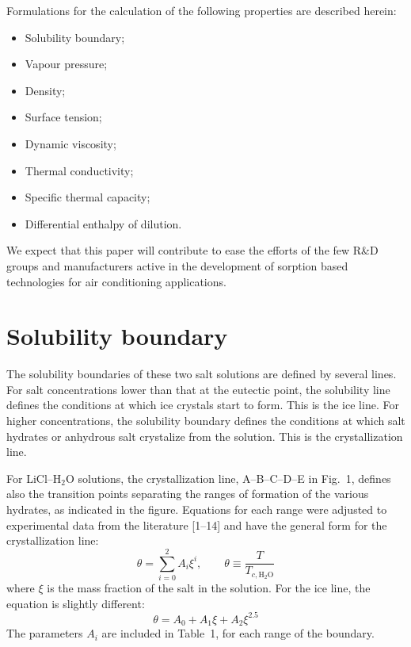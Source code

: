 \documentclass[11pt]{article}
\begin{document}
Formulations for the calculation of the following properties are described herein:
\begin{itemize}
\item Solubility boundary;
\item Vapour pressure;
\item Density;
\item Surface tension;
\item Dynamic viscosity;
\item Thermal conductivity;
\item Specific thermal capacity;
\item Differential enthalpy of dilution.
\end{itemize}

We expect that this paper will contribute to ease the efforts of the few R\&D groups and
manufacturers active in the development of sorption based technologies for air
conditioning applications.

\section{Solubility boundary}

The solubility boundaries of these two salt solutions are defined by several lines. For
salt concentrations lower than that at the eutectic point, the solubility line defines the
conditions at which ice crystals start to form. This is the ice line. For higher
concentrations, the solubility boundary defines the conditions at which salt hydrates or
anhydrous salt crystalize from the solution. This is the crystallization line.

For LiCl--H$_2$O solutions, the crystallization line, A--B--C--D--E in Fig.~1, defines also
the transition points separating the ranges of formation of the various hydrates, as
indicated in the figure. Equations for each range were adjusted to experimental data from
the literature [1--14] and have the general form for the crystallization line:
\begin{equation}
\theta = \sum_{i=0}^{2} A_i \xi^i, \qquad \theta \equiv \frac{T}{T_{c,\mathrm{H_2O}}}
\end{equation}
where $\xi$ is the mass fraction of the salt in the solution. For the ice line, the
equation is slightly different:
\begin{equation}
\theta = A_0 + A_1 \xi + A_2 \xi^{2.5}
\end{equation}
The parameters $A_i$ are included in Table~1, for each range of the boundary.
\end{document}
